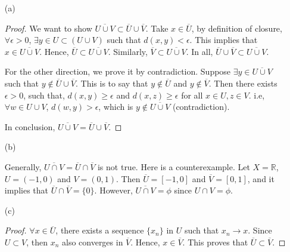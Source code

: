 \documentclass[12pt]{article}
\begin{document}
\begin{enumerate}
\item [(a)]

\begin{proof}

We want to show $\overline{U\cup V} \subset \overline U \cup \overline V$. Take $x \in \overline U$, by definition of closure, $\forall \epsilon >0$, $\exists y \in U\subset (U\cup V)$ such that  $d(x, y) < \epsilon$. This implies that $x \in \overline{U\cup V}$. Hence, $\overline U \subset \overline{U\cup V}$. Similarly, $\overline V \subset \overline{U\cup V}$. In all, $\overline U \cup \overline V \subset \overline{U\cup V}$.

For the other direction, we prove it by contradiction. Suppose $\exists y \in \overline{U \cup V}$ such that $y \notin \overline U \cup \overline V$. This is to say that $y\notin \overline U$ and $y \notin \overline V$. Then there exists $\epsilon > 0$, such that, $d(x, y) \geqslant \epsilon$ and $d(x, z) \geqslant \epsilon$ for all $x\in U, z \in V$. i.e, $\forall w \in U\cup V$, $d(w, y) > \epsilon$, which is $y\notin \overline{U \cup V}$ (contradiction).

In conclusion, $\overline{U\cup V} = \overline U \cup \overline V$.

\end{proof}


\item [(b)]

Generally, $\overline{U\cap V} = \overline U \cap \overline V$ is not true. Here is a counterexample. Let $X = \mathbb R$, $U = (-1, 0)$ and $V = (0, 1)$. Then $\overline U = [-1, 0]$ and $\overline V = [0, 1]$, and it implies that $\overline U \cap \overline V = \{ 0 \} $. However, $\overline {U\cap V} = \phi$ since $U\cap V = \phi$.

\item [(c)]

\begin{proof}

$\forall x \in \overline U$, there exists a sequence $\{x_n\}$ in $U$ such that $x_n \rightarrow x$. Since $U \subset V$, then $x_n$ also converges in $\overline V$. Hence, $x \in \overline V$. This proves that $\overline U \subset \overline V$.

\end{proof}

\end{enumerate}
\end{document}
